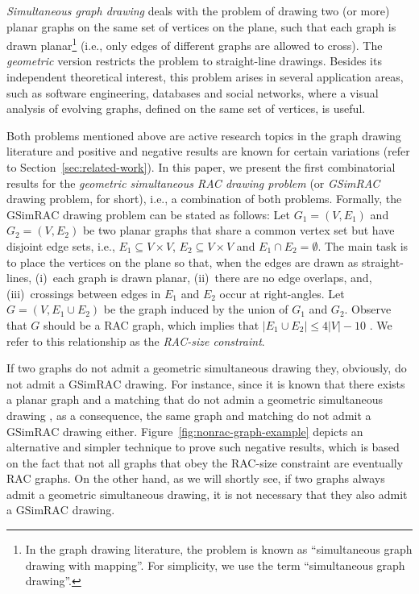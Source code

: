\documentclass{llncs}
\newcommand{\GSimRAC}{\mathrm{GSimRAC}}
\begin{document}
\emph{Simultaneous graph drawing} deals with the problem of drawing
two (or more) planar graphs on the same set of vertices on the
plane, such that each graph is drawn planar\footnote{In the graph
drawing literature, the problem is known as ``simultaneous graph
drawing with mapping''. For simplicity, we use the term
``simultaneous graph drawing''.} (i.e., only edges of different
graphs are allowed to cross). The \emph{geometric} version restricts
the problem to straight-line drawings. Besides its independent
theoretical interest, this problem arises in several application
areas, such as software engineering, databases and social networks,
where a visual analysis of evolving graphs, defined on the same set
of vertices, is useful.

Both problems mentioned above are active research topics in the
graph drawing literature and positive and negative results are known
for certain variations (refer to Section~\ref{sec:related-work}). In
this paper, we present the first combinatorial results for the
\emph{geometric simultaneous RAC drawing problem} (or \emph{GSimRAC}
drawing problem, for short), i.e., a combination of both problems.
Formally, the $\GSimRAC$ drawing problem can be stated as follows:
Let $G_1=(V,E_1)$ and $G_2=(V,E_2)$ be two planar graphs that share
a common vertex set but have disjoint edge sets, i.e., $E_1
\subseteq V \times V$, $E_2 \subseteq V \times V$ and $E_1 \cap E_2
= \emptyset$. The main task is to place the vertices on the plane so
that, when the edges are drawn as straight-lines, (i)~each graph is
drawn planar, (ii)~there are no edge overlaps, and, (iii)~crossings
between edges in $E_1$ and $E_2$ occur at right-angles. Let $G=(V,
E_1 \cup E_2)$ be the graph induced by the union of $G_1$ and $G_2$.
Observe that $G$ should be a RAC graph, which implies that $|E_1
\cup E_2| \leq 4|V|-10$ \cite{DEL09}. We refer to this relationship
as the \emph{RAC-size constraint}.

If two graphs do not admit a geometric simultaneous drawing they,
obviously, do not admit a $\GSimRAC$ drawing. For instance, since it
is known that there exists a planar graph and a matching that do not
admin a geometric simultaneous drawing \cite{CvKLMSV11}, as a
consequence, the same graph and matching do not admit a $\GSimRAC$
drawing either. Figure~\ref{fig:nonrac-graph-example} depicts an
alternative and simpler technique to prove such negative results,
which is based on the fact that not all graphs that obey the
RAC-size constraint are eventually RAC graphs. On the other hand, as
we will shortly see, if two graphs always admit a geometric
simultaneous drawing, it is not necessary that they also admit a
$\GSimRAC$ drawing.
\end{document}
